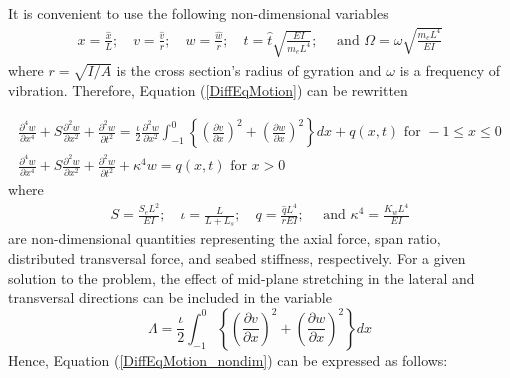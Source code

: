 \documentclass[3p,doublespacing,authoryear,11pt]{elsarticle} %
\begin{document}
It is convenient to use the following non-dimensional variables 
 \begin{equation}\label{NonDimensionalVar}
 \begin{array}{l } 
\displaystyle   x = \frac{\hat{x}}{L}; \quad  v = \frac{\hat{v}}{r}; \quad  w = \frac{\hat{w}}{r}; \quad  t = \hat{t} \sqrt{\frac{EI}{m_e L^4}} ; \quad \text{ and }  \Omega = \omega\sqrt{ \frac{m_e L^4}{EI}}
  \end{array}  
\end{equation}
where $r = \sqrt{I/A}$ is the cross section's radius of gyration and $\omega$ is a frequency of vibration. Therefore, Equation (\ref{DiffEqMotion}) can be rewritten 

 \begin{equation}\label{DiffEqMotion_nondim}
 \begin{array}{l } 
\displaystyle  \frac{\partial^4 w}{\partial x^4} + S \frac{\partial^2 w}{\partial x^2}  + \frac{\partial^2 w}{\partial t^2} = \frac{\iota}{2} \frac{\partial^2 w}{\partial x^2} \int_{-1}^0 \left\{\left( \frac{\partial v}{\partial x}  \right)^2 + \left(  \frac{\partial w}{\partial x}  \right)^2 \right\}dx+ q (x,t) \text{ for } -1 \le x \le 0 \\
\displaystyle  \frac{\partial^4 w}{\partial x^4} + S \frac{\partial^2 w}{\partial x^2} + \frac{\partial^2 w}{\partial t^2} + \kappa^4 w  =  q (x,t) \text{ for } x > 0
  \end{array}  
\end{equation}
where 
 \begin{equation}\label{NonDimensionalquantities}
 \begin{array}{l } 
\displaystyle   S = \frac{S_e L^2}{EI}; \quad \iota = \frac{L}{L+L_s}; \quad  q = \frac{\hat{q} L^4}{rEI}; \quad \text{ and }  \kappa^4 = \frac{K_w L^4}{EI}
  \end{array}  
\end{equation}
are non-dimensional quantities representing the axial force, span ratio, distributed transversal force, and seabed stiffness, respectively. For a given solution to the problem, the effect of mid-plane stretching in the lateral and transversal directions can be included in the variable \[ \Lambda = \frac{\iota}{2} \int_{-1}^0  \left\{\left( \frac{\partial v}{\partial x}  \right)^2 + \left(  \frac{\partial w}{\partial x}  \right)^2 \right\} dx \] Hence, Equation (\ref{DiffEqMotion_nondim}) can be expressed as follows:
\end{document}
